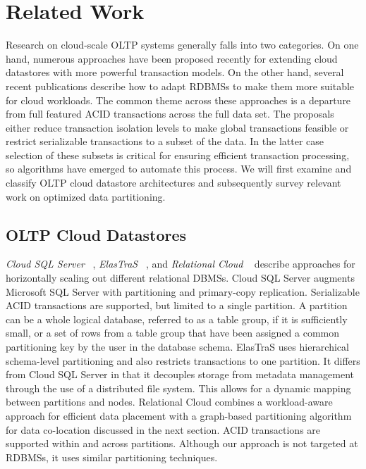 \documentclass[10pt,final,journal]{IEEEtran}
\begin{document}
\section{Related Work}
Research on cloud-scale OLTP systems generally falls into two categories. On one hand, numerous approaches have been proposed recently for extending cloud datastores with more powerful transaction models. On the other hand, several recent publications describe how to adapt RDBMSs to make them more suitable for cloud workloads. The common theme across these approaches is a departure from full featured ACID transactions across the full data set. The proposals either reduce transaction isolation levels to make global transactions feasible or restrict serializable transactions to a subset of the data. In the latter case selection of these subsets is critical for ensuring efficient transaction processing, so algorithms have emerged to automate this process. We will first examine and classify OLTP cloud datastore architectures and subsequently survey relevant work on optimized data partitioning.

\subsection{OLTP Cloud Datastores}
\emph{Cloud SQL Server} ~\cite{Campbell:2010:ESF:1807167.1807280, Bernstein:2011:AMS:2004686.2005651}, \emph{ElasTraS} ~\cite{Das:2009:EET:1855533.1855540, Das:2010:EAE}, and \emph{Relational Cloud} ~\cite{Curino:2011:JPMWMBZ11} describe approaches for horizontally scaling out different relational DBMSs. Cloud SQL Server augments Microsoft SQL Server with partitioning and primary-copy replication. Serializable ACID transactions are supported, but limited to a single partition. A partition can be a whole logical database, referred to as a table group, if it is sufficiently small, or a set of rows from a table group that have been assigned a common partitioning key by the user in the database schema. ElasTraS uses hierarchical schema-level partitioning and also restricts transactions to one partition. It differs from Cloud SQL Server in that it decouples storage from metadata management through the use of a distributed file system. This allows for a dynamic mapping between partitions and nodes. Relational Cloud combines a workload-aware approach for efficient data placement with a graph-based partitioning algorithm for data co-location discussed in the next section. ACID transactions are supported within and across partitions. Although our approach is not targeted at RDBMSs, it uses similar partitioning techniques.
\end{document}
